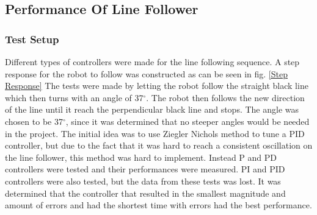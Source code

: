 \subsection{Performance Of Line Follower}

\subsubsection{Test Setup}
Different types of controllers were made for the line following sequence.  A step response for the robot to follow was constructed as can be seen in fig. \ref{Step Response} The tests were made by letting the robot follow the straight black line which then turns with an angle of 37$^{\circ}$. The robot then follows the new direction of the line until it reach the perpendicular black line and stops. The angle was chosen to be 37$^{\circ}$, since it was determined that no steeper angles would be needed in the project. The initial idea was to use Ziegler Nichols method to tune a PID controller, but due to the fact that it was hard to reach a consistent oscillation on the line follower, this method was hard to implement. Instead P and PD controllers were tested and their performances were measured. PI and PID controllers were also tested, but the data from these tests was lost. It was determined that the controller that resulted in the smallest magnitude and amount of errors and had the shortest time with errors had the best performance. 


